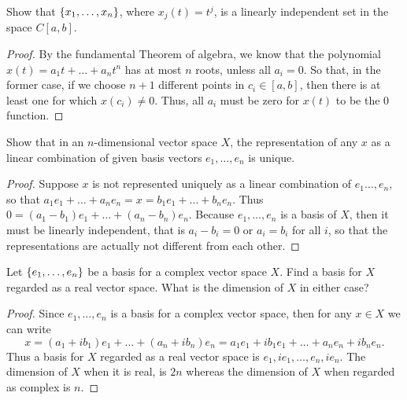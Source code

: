 \begin{exercise}{5}
Show that $\{x_1,\dots,x_n\}$, where $x_j(t)=t^j$, is a linearly independent set in the space $C[a,b]$.
\end{exercise}
\begin{proof}
By the fundamental Theorem of algebra, we know that the polynomial $x(t)=a_1t+\dots+a_nt^n$ has at most $n$ roots, unless all $a_i=0$. So that, in the former case, if we choose $n+1$ different points in $c_i\in[a,b]$, then there is at least one for which $x(c_i)\neq 0$. Thus, all $a_i$ must be zero for $x(t)$ to be the 0 function.
\end{proof}

\begin{exercise}{6}
Show that in an $n$-dimensional vector space $X$, the representation of any $x$ as a linear combination of given basis vectors $e_1,\dots,e_n$ is unique.
\end{exercise}
\begin{proof}
Suppose $x$ is not represented uniquely as a linear combination of $e_1\dots,e_n$, so that $a_1e_1+\dots+a_ne_n=x=b_1e_1+\dots+b_ne_n$. Thus $0=(a_1-b_1)e_1+\dots+(a_n-b_n)e_n$. Because $e_1,\dots,e_n$ is a basis of $X$, then it must be linearly independent, that is $a_i-b_i=0$ or $a_i=b_i$ for all $i$, so that the representations are actually not different from each other.
\end{proof}

\begin{exercise}{7}
Let $\{e_1,\dots,e_n\}$ be a basis for a complex vector space $X$. Find a basis for $X$ regarded as a real vector space. What is the dimension of $X$ in either case?
\end{exercise}
\begin{proof}
Since $e_1,\dots,e_n$ is a basis for a complex vector space, then for any $x\in X$ we can write 
\[
x = (a_1+ib_1)e_1+\dots+(a_n+ib_n)e_n = a_1e_1+ib_1e_1+\dots+a_ne_n+ib_ne_n.
\]
Thus a basis for $X$ regarded as a real vector space is $e_1,ie_1,\dots,e_n,ie_n$. The dimension of $X$ when it is real, is $2n$ whereas the dimension of $X$ when regarded as complex is $n$.
\end{proof}